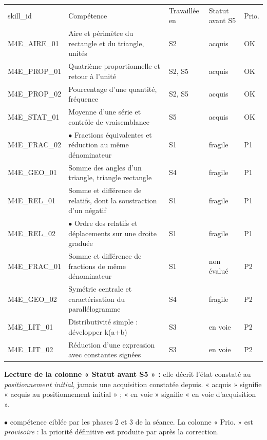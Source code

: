 \documentclass[10pt,a4paper]{article}
\begin{document}
\par\noindent\begin{tabularx}{\linewidth}{>{\ttfamily\scriptsize}p{27mm} X >{\scriptsize}p{16mm} >{\scriptsize}p{20mm} >{\scriptsize\centering\arraybackslash}p{9mm}}
\rowcolor{Navy}\color{white}\scriptsize skill\_id & \color{white}Compétence & \color{white}Travaillée en & \color{white}Statut avant S5 & \color{white}Prio. \\
M4E\_AIRE\_01 & Aire et périmètre du rectangle et du triangle, unités & S2 & acquis & OK \\
M4E\_PROP\_01 & Quatrième proportionnelle et retour à l'unité & S2, S5 & acquis & OK \\
M4E\_PROP\_02 & Pourcentage d'une quantité, fréquence & S2, S5 & acquis & OK \\
M4E\_STAT\_01 & Moyenne d'une série et contrôle de vraisemblance & S5 & acquis & OK \\
M4E\_FRAC\_02 & $\bullet$ Fractions équivalentes et réduction au même dénominateur & S1 & fragile & P1 \\
M4E\_GEO\_01 & Somme des angles d'un triangle, triangle rectangle & S4 & fragile & P1 \\
M4E\_REL\_01 & Somme et différence de relatifs, dont la soustraction d'un négatif & S1 & fragile & P1 \\
M4E\_REL\_02 & $\bullet$ Ordre des relatifs et déplacements sur une droite graduée & S1 & fragile & P1 \\
M4E\_FRAC\_01 & Somme et différence de fractions de même dénominateur & S1 & non évalué & P2 \\
M4E\_GEO\_02 & Symétrie centrale et caractérisation du parallélogramme & S4 & fragile & P2 \\
M4E\_LIT\_01 & Distributivité simple : développer k(a+b) & S3 & en voie & P2 \\
M4E\_LIT\_02 & Réduction d'une expression avec constantes signées & S3 & en voie & P2 \\
\end{tabularx}
\par\vspace{1mm}\small\textbf{Lecture de la colonne « Statut avant S5 » :} elle décrit l'état constaté au \emph{positionnement initial}, jamais une acquisition constatée depuis. « acquis » signifie « acquis au positionnement initial » ; « en voie » signifie « en voie d'acquisition ».
\par\small$\bullet$ compétence ciblée par les phases 2 et 3 de la séance. La colonne « Prio. » est \emph{provisoire} : la priorité définitive est produite par  après la correction.
\end{document}

